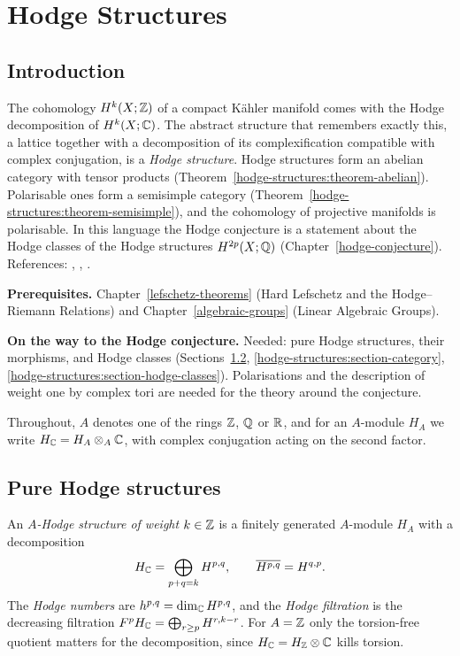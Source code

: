 \chapter{Hodge Structures}\label{hodge-structures}

\section{Introduction}\label{hodge-structures:section-introduction}

The cohomology $H^k(X; \mathbb{Z})$ of a compact K\"ahler manifold comes with the Hodge decomposition of $H^k(X; \mathbb{C})$. The abstract structure that remembers
exactly this, a lattice together with a decomposition of its complexification compatible with complex conjugation, is a \emph{Hodge structure}. Hodge
structures form an abelian category with tensor products (Theorem~\ref{hodge-structures:theorem-abelian}). Polarisable ones form a semisimple category
(Theorem~\ref{hodge-structures:theorem-semisimple}), and the cohomology of projective manifolds is polarisable. In this language the Hodge conjecture is a statement
about the Hodge classes of the Hodge structures $H^{2p}(X; \mathbb{Q})$ (Chapter~\ref{hodge-conjecture}). References: \cite[Chapter 7]{voisin-hodge-1}, \cite{deligne-hodge-2},
\cite[Chapter 2]{peters-steenbrink}.

\noindent\textbf{Prerequisites.} Chapter~\ref{lefschetz-theorems} (Hard Lefschetz and the Hodge--Riemann Relations) and Chapter~\ref{algebraic-groups} (Linear Algebraic
Groups).

\noindent\textbf{On the way to the Hodge conjecture.} Needed: pure Hodge structures, their morphisms, and Hodge classes (Sections~\ref{hodge-structures:section-definition}, \ref{hodge-structures:section-category}, \ref{hodge-structures:section-hodge-classes}). Polarisations and the
description of weight one by complex tori are needed for the theory around the conjecture.

Throughout, $A$ denotes one of the rings $\mathbb{Z}$, $\mathbb{Q}$ or $\mathbb{R}$, and for an $A$-module $H_A$ we write $H_{\mathbb{C}} = H_A \otimes_A\mathbb{C}$, with complex conjugation acting on the second
factor.

\section{Pure Hodge structures}\label{hodge-structures:section-definition}

\begin{definition}\label{hodge-structures:definition-hodge-structure}
An \emph{$A$-Hodge structure of weight $k \in \mathbb{Z}$} is a finitely generated $A$-module $H_A$ with a decomposition
\[
H_{\mathbb{C}} = \bigoplus_{p+q=k}H^{p,q}, \qquad \overline{H^{p,q}} = H^{q,p}.
\]
The \emph{Hodge numbers} are $h^{p,q} = \dim_{\mathbb{C}} H^{p,q}$, and the \emph{Hodge filtration} is the decreasing filtration $F^pH_{\mathbb{C}} = \bigoplus_{r \geq p}H^{r,k-r}$. For $A = \mathbb{Z}$ only the
torsion-free quotient matters for the decomposition, since $H_{\mathbb{C}} = H_{\mathbb{Z}} \otimes \mathbb{C}$ kills torsion.
\end{definition}

